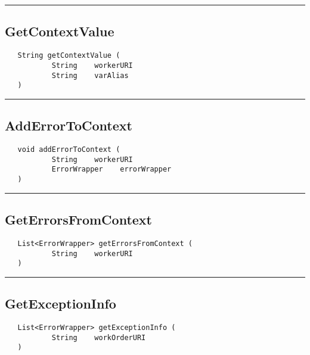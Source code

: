 \rule{15cm}{2pt}
\subsection{GetContextValue}
\label{Api:GetContextValue}
\begin{verbatim}
   String getContextValue (
           String    workerURI
           String    varAlias
   )
\end{verbatim}



\rule{15cm}{2pt}
\subsection{AddErrorToContext}
\label{Api:AddErrorToContext}
\begin{verbatim}
   void addErrorToContext (
           String    workerURI
           ErrorWrapper    errorWrapper
   )
\end{verbatim}



\rule{15cm}{2pt}
\subsection{GetErrorsFromContext}
\label{Api:GetErrorsFromContext}
\begin{verbatim}
   List<ErrorWrapper> getErrorsFromContext (
           String    workerURI
   )
\end{verbatim}



\rule{15cm}{2pt}
\subsection{GetExceptionInfo}
\label{Api:GetExceptionInfo}
\begin{verbatim}
   List<ErrorWrapper> getExceptionInfo (
           String    workOrderURI
   )
\end{verbatim}



